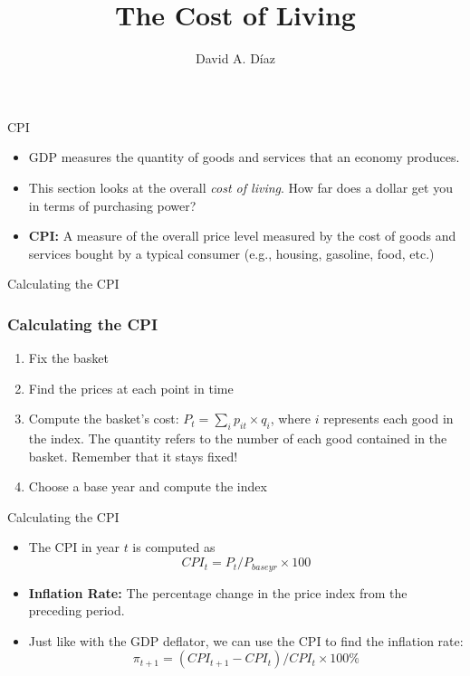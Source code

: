 \documentclass[xcolor={dvipsnames},pdf, hyperref={colorlinks=true, citecolor=ForestGreen, linkcolor=BlueViolet, urlcolor=Magenta}]{beamer}
\title{The Cost of Living}
\author{David A. D\'iaz}
\institute{UNC Chapel Hill}
\date{}
\theoremstyle{definition}
\newcommand{\defn}[1]{\textbf{#1}}
\begin{document}
 
	
	\begin{frame}
		
		\titlepage
		
	\end{frame}


\begin{frame}{CPI}
\begin{itemize}
	\item GDP measures the quantity of goods and services that an economy produces. \item This section looks at the overall \textit{cost of living}. How far does a dollar get you in terms of purchasing power?
	\item \defn{CPI:} A measure of the overall price level measured by the cost of goods and services bought by a typical consumer (e.g., housing, gasoline, food, etc.)
	
\end{itemize}
\end{frame}

\begin{frame}{Calculating the CPI}

\subsubsection*{Calculating the CPI}

\begin{enumerate}
	\item Fix the basket 
	\item Find the prices at each point in time
	\item Compute the basket's cost: $P_t = \sum_i p_{it} \times q_{i}$, where $i$ represents each good in the index. The quantity refers to the number of each good contained in the basket. Remember that it stays fixed!
	\item Choose a base year and compute the index
\end{enumerate}
\end{frame}

\begin{frame}{Calculating the CPI}
\begin{itemize}
	\item The CPI in year $t$ is computed as 
	\[CPI_t = P_t/P_{base yr} \times 100\]
	\item \defn{Inflation Rate:} The percentage change in the price index from the preceding period.
	\item Just like with the GDP deflator, we can use the CPI to find the inflation rate:
	\[\pi_{t+1} = (CPI_{t+1} - CPI_t)/CPI_t \times 100\%\]
\end{itemize}
\end{frame}
\end{document}

